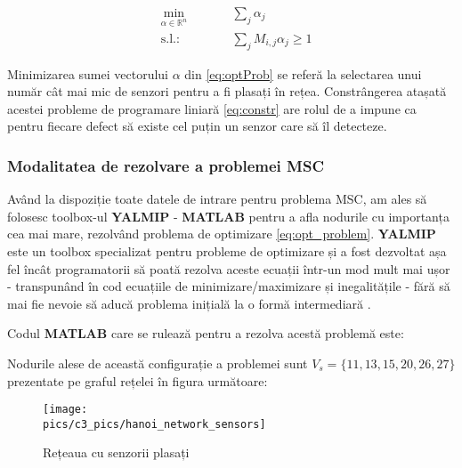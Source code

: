 \begin{subequations}
\begin{alignat}{2}
&\!\min_{\alpha \in \mathbb{R}^n}        &\qquad& \sum_{j} \alpha_{j} \label{eq:optProb}\\
&\text{s.l.:} &      & \sum_{j} M_{i,j}\alpha_{j} \geq 1 \label{eq:constr}
\end{alignat}
\label{eq:opt_problem}
\end{subequations}

 Minimizarea sumei vectorului $\alpha$ din \ref{eq:optProb} se referă la selectarea unui număr cât mai mic de senzori pentru a fi plasați în rețea. Constrângerea atașată acestei probleme de programare liniară \eqref{eq:constr} are rolul de a impune ca pentru fiecare defect să existe cel puțin un senzor care să îl detecteze.
 
\subsubsection{Modalitatea de rezolvare a problemei MSC}
Având la dispoziție toate datele de intrare pentru problema MSC, am ales să folosesc toolbox-ul \textbf{YALMIP} - \textbf{MATLAB} pentru a afla nodurile cu importanța cea mai mare, rezolvând problema de optimizare \eqref{eq:opt_problem}. \textbf{YALMIP} este un toolbox specializat pentru probleme de optimizare și a fost dezvoltat așa fel încât programatorii să poată rezolva aceste ecuații într-un mod mult mai ușor - transpunând în cod ecuațiile de minimizare/maximizare și inegalitățile - fără să mai fie nevoie să aducă problema inițială la o formă intermediară \cite{YALMIP}.

Codul \textbf{MATLAB} care se rulează pentru a rezolva acestă problemă este:



Nodurile alese de această configurație a problemei sunt $V_s = \{11, 13, 15,20, 26, 27\}$ prezentate pe graful rețelei în figura următoare:

\begin{figure}[H]
\centering
\texttt{[image: \\pics/c3\_pics/hanoi\_network\_sensors]}
\caption{Rețeaua cu senzorii plasați}
\label{fig:binary_matrix}
\end{figure}

